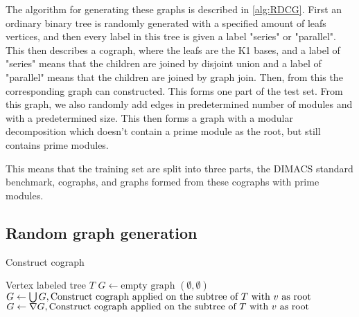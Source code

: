 \documentclass{amsart}
\begin{document}
The algorithm for generating these graphs is described in \autoref{alg:RDCG}. First an
ordinary binary tree is randomly generated with a specified amount of leafs
vertices, and then every label in this tree is given a label "series" or
"parallel".  This then describes a cograph, where the leafs are the K1 bases,
and a label of "series" means that the children are joined by disjoint union and a label
of "parallel" means that the children are joined by graph join. Then, from this
the corresponding graph can constructed. This forms one part of the test set.
From this graph, we also randomly add edges in predetermined number of modules
and with a predetermined size. This then forms a graph with a modular
decomposition which doesn't contain a prime module as the root, but still
contains prime modules.

This means that the training set are split into three parts, the DIMACS standard
benchmark, cographs, and graphs formed from these cographs with prime modules.


\subsection{Random graph generation}

\begin{algorithm}[H]
    \caption{Construct cograph}
    \begin{algorithmic}[1]
        \REQUIRE Vertex labeled tree $T$
        \ENDIF
        \STATE $G \leftarrow \text{empty graph $(\emptyset,\emptyset)$}$
                \STATE $G \leftarrow \bigcup G, \text{\text{Construct cograph} applied
                on the subtree of $T$ with $v$ as root} $
                \STATE $G \leftarrow \nabla G, \text{\text{Construct cograph} applied
                on the subtree of $T$ with $v$ as root}$
            \ENDIF
        \ENDFOR
    \end{algorithmic}
\end{algorithm}
\end{document}
